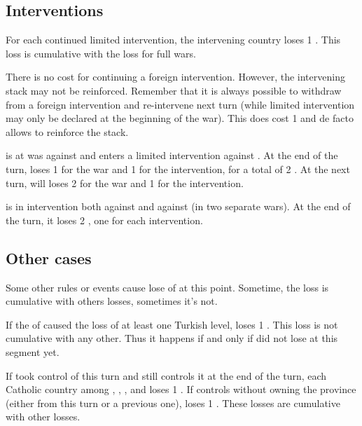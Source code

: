 \subsection{Interventions}
\bparag For each continued limited intervention, the intervening country loses
1 \STAB.
\bparag This loss is cumulative with the loss for full wars.

\bparag There is no cost for continuing a foreign intervention. However, the
intervening stack may not be reinforced.
\bparag Remember that it is always possible to withdraw from a foreign
intervention and re-intervene next turn (while limited intervention may only
be declared at the beginning of the war). This does cost 1 \STAB and de facto
allows to reinforce the stack.

\begin{exemple}[Interventions]
  \FRA is at was against \HIS and enters a limited intervention against
  \ANG. At the end of the turn, \FRA loses 1 \STAB for the war and 1 for the
  intervention, for a total of 2 \STAB. At the next turn, \FRA will loses
  2 \STAB for the war and 1 for the intervention.

  \ANG is in intervention both against \FRA and against \AUS (in two separate
  wars). At the end of the turn, it loses 2 \STAB, one for each intervention.
\end{exemple}

\subsection{Other cases}
\aparag Some other rules or events cause lose of \STAB at this point.
\bparag Sometime, the loss is cumulative with others losses, sometimes it's
not. 

\bparag If the \corsaire of \paysChevaliers caused the loss of at least one
Turkish \TradeFLEET level, \TUR loses 1 \STAB.
\bparag This loss is not cumulative with any other. Thus it happens if and
only if \TUR did not lose \STAB at this segment yet.

\aparag[\villeVienne]
\bparag If \TUR took control of \villeVienne this turn and still controls it
at the end of the turn, each Catholic country among \HIS, \AUS, \POL, \FRA and
\ANG loses 1 \STAB.
\bparag If \TUR controls \villeVienne without owning the province (either from
this turn or a previous one), \HAB loses 1 \STAB.
\bparag These losses are cumulative with other losses.

